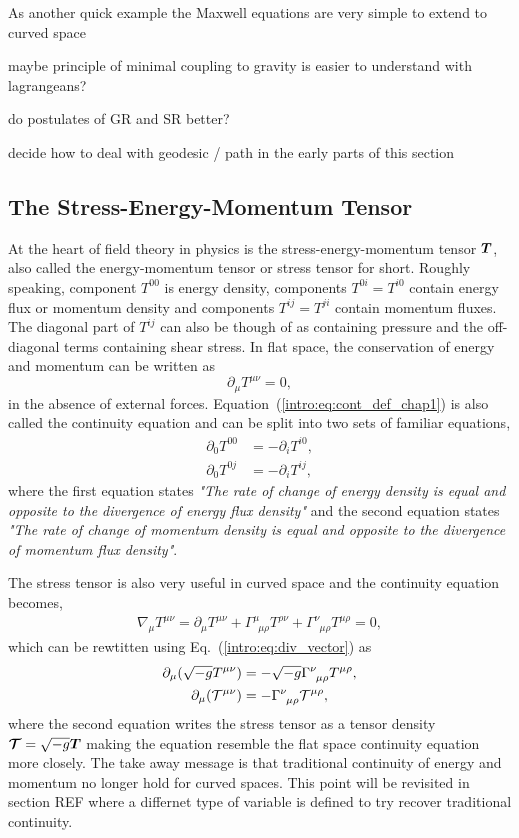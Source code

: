 As another quick example the Maxwell equations are very simple to extend to curved space

maybe principle of minimal coupling to gravity is easier to understand with lagrangeans?


do postulates of GR and SR better?


decide how to deal with geodesic / path in the early parts of this section

\subsection{The Stress-Energy-Momentum Tensor}
At the heart of field theory in physics is the stress-energy-momentum tensor $\boldsymbol{T}$, also called the energy-momentum tensor or stress tensor for short. Roughly speaking, component $T^{00}$ is energy density, components $T^{0i}=T^{i0}$ contain energy flux or momentum density and components $T^{ij}=T^{ji}$ contain momentum fluxes. The diagonal part of $T^{ij}$ can also be though of as containing pressure and the off-diagonal terms containing shear stress. In flat space, the conservation of energy and momentum can be written as 
\begin{equation}
\partial_\mu T^{\mu\nu} =0,\label{intro:eq:cont_def_chap1}
\end{equation}
in the absence of external forces. Equation~(\ref{intro:eq:cont_def_chap1}) is also called the continuity equation and can be split into two sets of familiar equations,
\begin{align}
\partial_0 T^{00} &= - \partial_i T^{i0}, \\
\partial_0 T^{0j} &= - \partial_i T^{ij},
\end{align}
where the first equation states {\it "The rate of change of energy density is equal and opposite to the divergence of energy flux density"} and the second equation states {\it "The rate of change of momentum density is equal and opposite to the divergence of momentum flux density"}. 

The stress tensor is also very useful in curved space and the continuity equation becomes,
\begin{align}
\nabla_\mu T^{\mu\nu} = \partial_\mu T^{\mu\nu}  + \Gamma^\mu_{\,\,\,\mu \rho}T^{\rho \nu}  + \Gamma^\nu_{\,\,\,\mu\rho}T^{\mu\rho}= 0\label{intro:eq:cont},
\end{align}
which can be rewtitten using Eq.~(\ref{intro:eq:div_vector}) as 
\begin{align}
\partial_\mu( \sqrt{-g} T^{\mu\nu})  &=-\sqrt{-g} \Gamma^\nu_{\,\,\,\mu\rho}T^{\mu\rho},\\
\partial_\mu( \mathcal{T}^{\mu\nu})  &=-\Gamma^\nu_{\,\,\,\mu\rho}\mathcal{T}^{\mu\rho},
\end{align}
where the second equation writes the stress tensor as a tensor density $\boldsymbol{\mathcal{T}} = \sqrt{-g} \boldsymbol{T}$ making the equation resemble the flat space continuity equation more closely. The take away message is that traditional continuity of energy and momentum no longer hold for curved spaces. This point will be revisited in section REF where a differnet type of variable is defined to try recover traditional continuity.


